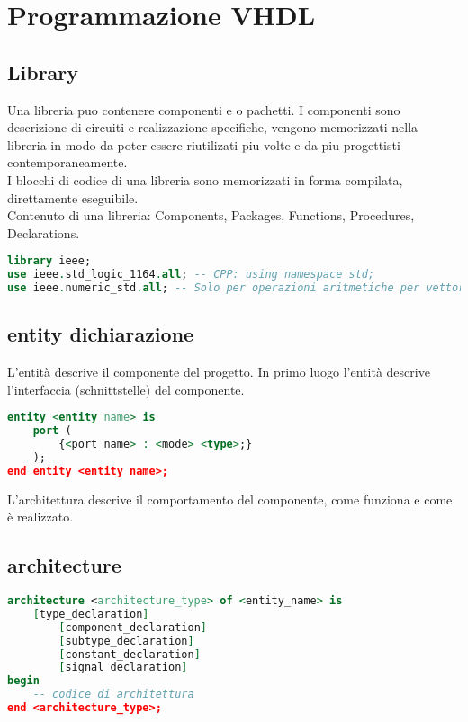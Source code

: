 \section{Programmazione VHDL}
    \subsection{Library}
        Una libreria puo contenere componenti e o pachetti. I componenti sono descrizione di circuiti e realizzazione specifiche,
        vengono memorizzati nella libreria in modo da poter essere riutilizati piu volte e da piu progettisti contemporaneamente.\\
        I blocchi di codice di una libreria sono memorizzati in forma compilata, direttamente eseguibile.\\
        Contenuto di una libreria: Components, Packages, Functions, Procedures, Declarations.
        \begin{lstlisting}[language=VHDL]
library ieee; 
use ieee.std_logic_1164.all; -- CPP: using namespace std;
use ieee.numeric_std.all; -- Solo per operazioni aritmetiche per vettori
        \end{lstlisting}


    \subsection{entity dichiarazione}
        L'entità descrive il componente del progetto.
        In primo luogo l'entità descrive l'interfaccia (schnittstelle) del componente.
        \begin{lstlisting}[language=VHDL]
entity <entity name> is
    port (
        {<port_name> : <mode> <type>;}
    );
end entity <entity name>;
        \end{lstlisting}

    L'architettura descrive il comportamento del componente, come funziona e come è realizzato.
    \subsection{architecture}
        \begin{lstlisting}[language=VHDL, numberstyle=\tiny\color{gray}\highlightlines{1,7,8,9}{green}]
architecture <architecture_type> of <entity_name> is
    [type_declaration]
        [component_declaration]
        [subtype_declaration]
        [constant_declaration]
        [signal_declaration]
begin
    -- codice di architettura
end <architecture_type>;
        \end{lstlisting}

